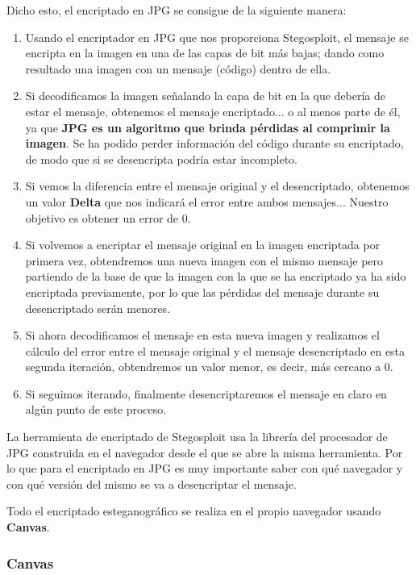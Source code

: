Dicho esto, el encriptado en JPG se consigue de la siguiente manera:

\begin{enumerate}
\item Usando el encriptador en JPG que nos proporciona Stegosploit, el mensaje se encripta en la imagen en una de las capas de bit más bajas; dando como resultado una imagen con un mensaje (código) dentro de ella.
\item Si decodificamos la imagen señalando la capa de bit en la que debería de estar el mensaje, obtenemos el mensaje encriptado... o al menos parte de él, ya que \textbf{JPG es un algoritmo que brinda pérdidas al comprimir la imagen}. Se ha podido perder información del código durante su encriptado, de modo que si se desencripta podría estar incompleto.
\item Si vemos la diferencia entre el mensaje original y el desencriptado, obtenemos un valor \textbf{Delta} que nos indicará el error entre ambos mensajes... Nuestro objetivo es obtener un error de 0.
\item Si volvemos a encriptar el mensaje original en la imagen encriptada por primera vez, obtendremos una nueva imagen con el mismo mensaje pero partiendo de la base de que la imagen con la que se ha encriptado ya ha sido encriptada previamente, por lo que las pérdidas del mensaje durante su desencriptado serán menores.
\item Si ahora decodificamos el mensaje en esta nueva imagen y realizamos el cálculo del error entre el mensaje original y el mensaje desencriptado en esta segunda iteración, obtendremos un valor menor, es decir, más cercano a 0.
\item Si seguimos iterando, finalmente desencriptaremos el mensaje en claro en algún punto de este proceso.
\end{enumerate}

La herramienta de encriptado de Stegosploit usa la librería del procesador de JPG construida en el navegador desde el que se abre la misma herramienta. Por lo que para el encriptado en JPG es muy importante saber con qué navegador y con qué versión del mismo se va a desencriptar el mensaje.

Todo el encriptado esteganográfico se realiza en el propio navegador usando \textbf{Canvas}. %

\subsubsection{Canvas}

